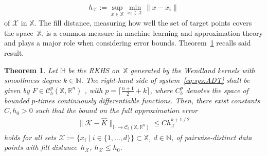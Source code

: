 \documentclass[a4paper, reqno]{amsart}
\newcommand{\R}{\ensuremath{\mathbb R}}
\newcommand{\N}{\ensuremath{\mathbb N}}
\newtheorem{theorem}{Theorem}[section]
\begin{document}
\begin{align*}
    h_\mathcal{X} := \sup_{x \in \mathbb{X}} \min_{x_i \in \mathcal{X}} \|x - x_i \|
\end{align*}
of $\mathcal{X}$ in $\mathbb{X}$. The fill distance, measuring how well the set of target points covers the space~$\mathbb{X}$, is a common measure in machine learning and approximation theory and  plays a major role when considering error bounds. Theorem~\ref{thm:koehne} recalls said result. 
\begin{theorem}
    \label{thm:koehne}
    Let $\mathbb{H}$ be the RKHS on~$\mathbb{X}$ generated by the Wendland kernels with smoothness degree $k \in \N$. 
    The right-hand side of system~\eqref{eq:sys:ADT} shall be given by ${F \in \mathcal{C}^p_b(\mathbb{X},\mathbb{R}^n)}$ , with $p = \lceil \frac{n + 1}{2} + k\rceil$, where $C_b^p$ denotes the space of bounded $p$-times continuously differentiable functions. 
    Then, there exist constants $C,h_0 > 0$ such that the bound on the full approximation error 
    \begin{align}\label{eq:error_bound}
        \| \mathcal{K} - \widehat{K}\|_{\mathbb{H} \rightarrow \mathcal{C}_b({\mathbb{X}},\R^n)} \le Ch_\mathcal{X}^{k+1 \mathbin{/} 2}
    \end{align}
    holds for all sets $\mathcal{X} :=\{ x_i \mid i \in \{1, \dots, d\} \} \subset \mathbb{X}$, $d \in \mathbb{N}$, of %
    pairwise-distinct data points with fill distance~$h_{\mathcal{X}}$, $h_{\mathcal{X}} \leq h_0$. 
\end{theorem}
\end{document}
